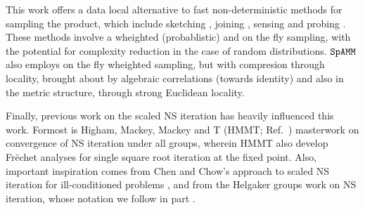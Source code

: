 \documentclass[letterpaper,twocolumn,amsmath,amsfont,amssymb,english,aps,jcp,preprintnumbers,groupaddress,nofootinbib,tightenlines,floatfix]{revtex4}
\newcommand{\mat}[1]{\boldsymbol{#1}}
\newcommand{\ot}{  {\scriptstyle \otimes}_{ \tau } }
\theoremstyle{plain}
\theoremstyle{remark}
\theoremstyle{plain}
\begin{document}
This work offers a data local alternative to fast non-deterministic methods for sampling the product, 
which include sketching \cite{Sarlos2006,Drineas2006,Mahoney2012,Pagh2013,Sivertsen2014,Woodruff2015},
joining \cite{Mishra92,Hoel94,Jacox03,Chen07,Amossen09,Lieberman08,Kim09}, 
sensing \cite{} and probing \cite{}.  These  methods involve a wheighted (probablistic) 
and on the fly sampling, with the potential for complexity reduction in the case of random distributions. 
$\tt SpAMM$ also employs on the fly wheighted sampling,  but with 
compresion through locality, brought about by algebraic correlations (towards identity) and also in the
metric structure, through strong Euclidean locality.



Finally, previous work on the scaled NS iteration has heavily influenced this work.  Formost is 
Higham, Mackey, Mackey and T (HMMT; Ref.~\cite{}) masterwork on convergence of NS iteration under all groups,
wherein HMMT also develop Fr\"{e}chet analyses for single square root iteration at the fixed point.
Also, important inspiration comes from Chen and Chow's \cite{} approach to scaled NS iteration for ill-conditioned problems \cite{}, 
and from the Helgaker groups work on NS iteration, whose notation we follow in part \cite{}.  

\end{document}
